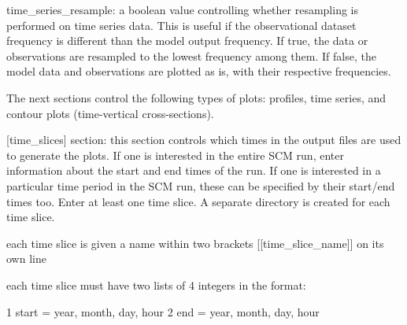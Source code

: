 \begin{DoxyItemize}
\begin{DoxyItemize}
\begin{DoxyItemize}
\item time\+\_\+series\+\_\+resample\+: a boolean value controlling whether resampling is performed on time series data. This is useful if the observational dataset frequency is different than the model output frequency. If true, the data or observations are resampled to the lowest frequency among them. If false, the model data and observations are plotted as is, with their respective frequencies.
\end{DoxyItemize}
\item The next sections control the following types of plots\+: profiles, time series, and contour plots (time-\/vertical cross-\/sections).
\begin{DoxyItemize}
\item \mbox{[}time\+\_\+slices\mbox{]} section\+: this section controls which times in the output files are used to generate the plots. If one is interested in the entire S\+CM run, enter information about the start and end times of the run. If one is interested in a particular time period in the S\+CM run, these can be specified by their start/end times too. Enter at least one time slice. A separate directory is created for each time slice.
\begin{DoxyItemize}
\item each time slice is given a name within two brackets \mbox{[}\mbox{[}time\+\_\+slice\+\_\+name\mbox{]}\mbox{]} on its own line
\item each time slice must have two lists of 4 integers in the format\+:
\begin{DoxyItemize}
\item 
\begin{DoxyCode}
1 start = year, month, day, hour
2 end = year, month, day, hour 
\end{DoxyCode}


\end{DoxyItemize}
\end{DoxyItemize}
\end{DoxyItemize}
\end{DoxyItemize}
\end{DoxyItemize}
